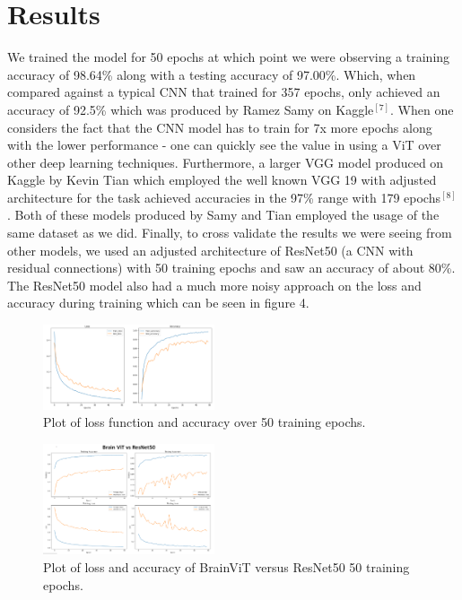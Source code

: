 \documentclass[conference]{IEEEtran}
\begin{document}
\section{Results}
We trained the model for 50 epochs at which point we were observing a training accuracy of 98.64\% along with a testing accuracy of 97.00\%. Which, when compared against a typical CNN that trained for 357 epochs, only achieved an accuracy of 92.5\% which was produced by Ramez Samy on Kaggle$^{[7]}$. When one considers the fact that the CNN model has to train for 7x more epochs along with the lower performance - one can quickly see the value in using a ViT over other deep learning techniques. Furthermore, a larger VGG model produced on Kaggle by Kevin Tian which employed the well known VGG 19 with adjusted architecture for the task achieved accuracies in the 97\% range with 179 epochs$^{[8]}$. Both of these models produced by Samy and Tian employed the usage of the same dataset as we did. Finally, to cross validate the results we were seeing from other models, we used an adjusted architecture of ResNet50 (a CNN with residual connections) with 50 training epochs and saw an accuracy of about 80\%. The ResNet50 model also had a much more noisy approach on the loss and accuracy during training which can be seen in figure 4.

\begin{figure}[htbp]
    \centering
    \includegraphics[width=0.45\textwidth]{lossacc over 50 epochs.PNG}
    \caption{Plot of loss function and accuracy over 50 training epochs.}
    \label{fig:2}
\end{figure}

\begin{figure}[htbp]
    \centering
    \includegraphics[width=0.45\textwidth]{resnet versus brainvit.PNG}
    \caption{Plot of loss and accuracy of BrainViT versus ResNet50 50 training epochs.}
    \label{fig:3}
\end{figure}
\end{document}

